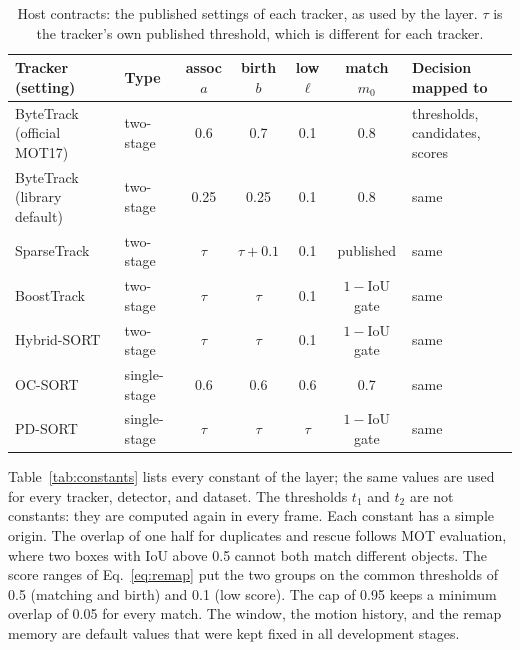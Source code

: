 \documentclass[pdflatex,sn-mathphys-num,iicol]{sn-jnl}
\makeatletter
\def\subsectionfont{\reset@font\fontfamily{\rmdefault}\fontsize{10bp}{12bp}\bfseries\selectfont\raggedright\boldmath}
\renewcommand\subsection{\@startsection{subsection}{2}{\z@}{-7pt \@plus -2pt \@minus -2pt}{3pt}{\subsectionfont}}
\makeatother
\begin{document}
\begin{table}[t]
\caption{Host contracts: the published settings of each tracker, as used by
the layer. $\tau$ is the tracker's own published threshold, which is
different for each tracker.}
\label{tab:contracts}
\centering\footnotesize
\setlength{\tabcolsep}{4pt}
\begin{tabular}{@{}>{\raggedright\arraybackslash}p{30mm}lcccc>{\raggedright\arraybackslash}p{32mm}@{}}
\toprule
Tracker (setting) & Type & assoc $a$ & birth $b$ & low $\ell$ & match $m_0$ & Decision mapped to\\
\midrule
ByteTrack (official MOT17) & two-stage & 0.6 & 0.7 & 0.1 & 0.8 & thresholds, candidates, scores\\
ByteTrack (library default) & two-stage & 0.25 & 0.25 & 0.1 & 0.8 & same\\
SparseTrack & two-stage & $\tau$ & $\tau+0.1$ & 0.1 & published & same\\
BoostTrack & two-stage & $\tau$ & $\tau$ & 0.1 & $1-$IoU gate & same\\
Hybrid-SORT & two-stage & $\tau$ & $\tau$ & 0.1 & $1-$IoU gate & same\\
OC-SORT & single-stage & 0.6 & 0.6 & 0.6 & 0.7 & same\\
PD-SORT & single-stage & $\tau$ & $\tau$ & $\tau$ & $1-$IoU gate & same\\
\bottomrule
\end{tabular}
\end{table}

\subsection{Fixed constants}\label{sec:constants}
Table~\ref{tab:constants} lists every constant of the layer; the same values
are used for every tracker, detector, and dataset. The thresholds $t_1$ and
$t_2$ are not constants: they are computed again in every frame. Each
constant has a simple origin. The overlap of one half for duplicates and
rescue follows MOT evaluation, where two boxes with IoU above 0.5 cannot both
match different objects. The score ranges of Eq.~\eqref{eq:remap} put the two
groups on the common thresholds of 0.5 (matching and birth) and 0.1 (low
score). The cap of 0.95 keeps a minimum overlap of 0.05 for every match. The
window, the motion history, and the remap memory are default values that were
kept fixed in all development stages.
\end{document}
